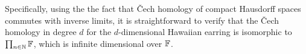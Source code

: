 Specifically, using the the fact that \v{C}ech homology of compact Hausdorff spaces commutes with inverse limits, it is straightforward to verify that the \v{C}ech homology in degree $d$ for the $d$-dimensional Hawaiian earring is isomorphic to $\prod_{n\in\mathbb{N}}\mathbb{F}$, which is infinite dimensional over $\mathbb{F}$. 
%
%
